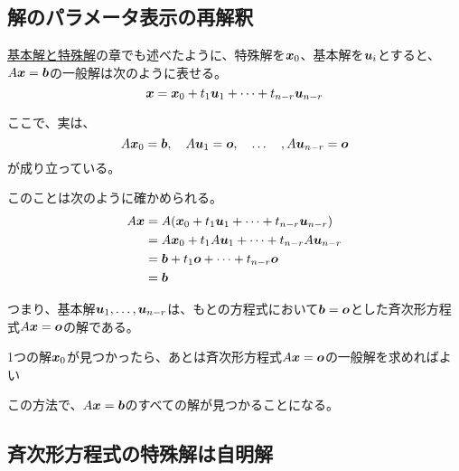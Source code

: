 \documentclass[../../../topic_linear-algebra]{subfiles}
\begin{document}
\subsection{解のパラメータ表示の再解釈}\label{sec:reinterpretation-of-parametric-solution}

\hyperref[sec:fundamental-and-particular-solutions]{基本解と特殊解}の章でも述べたように、特殊解を$\vb*{x}_0$、基本解を$\vb*{u}_i$とすると、$A\vb*{x} = \vb*{b}$の一般解は次のように表せる。
\begin{equation*}
  \vb*{x} = \vb*{x}_0 + t_1\vb*{u}_1 + \cdots + t_{n-r}\vb*{u}_{n-r}
\end{equation*}

ここで、実は、
\begin{equation*}
  A\vb*{x}_0 = \vb*{b},\quad A\vb*{u}_1 = \vb*{o},\quad \dots \quad , A\vb*{u}_{n-r} = \vb*{o}
\end{equation*}
が成り立っている。

\br

このことは次のように確かめられる。
\begin{align*}
  A\vb*{x} & = A(\vb*{x}_0 + t_1\vb*{u}_1 + \cdots + t_{n-r}\vb*{u}_{n-r}) \\
           & = A\vb*{x}_0 + t_1A\vb*{u}_1 + \cdots + t_{n-r}A\vb*{u}_{n-r} \\
           & = \vb*{b} + t_1\vb*{o} + \cdots + t_{n-r}\vb*{o}              \\
           & = \vb*{b}
\end{align*}

\br

つまり、基本解$\vb*{u}_1,\dots,\vb*{u}_{n-r}$は、もとの方程式において$\vb*{b} = \vb*{o}$とした斉次形方程式$A\vb*{x} = \vb*{o}$の解である。

\begin{emphabox}
  \begin{spacebox}
    \begin{center}
      1つの解$\vb*{x}_0$が見つかったら、あとは斉次形方程式$A\vb*{x} = \vb*{o}$の一般解を求めればよい
    \end{center}
  \end{spacebox}
\end{emphabox}

この方法で、$A\vb*{x} = \vb*{b}$のすべての解が見つかることになる。

\subsection{斉次形方程式の特殊解は自明解}
\end{document}
